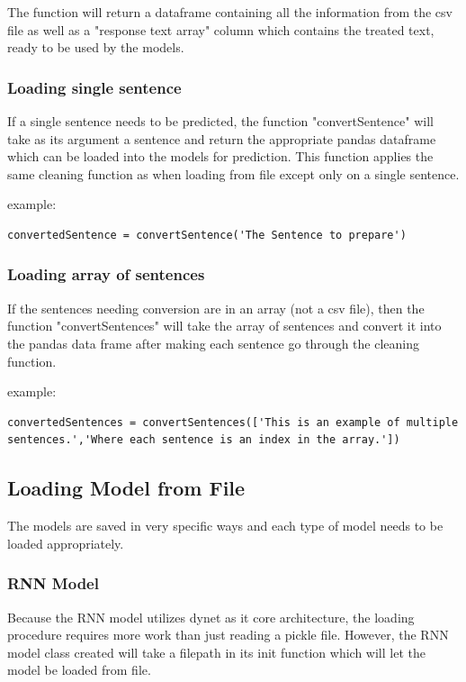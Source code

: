 \documentclass[twoside,twocolumn]{article}
\begin{document}
The function will return a dataframe containing all the information from the csv file as well as a "response text array" column which contains the
treated text, ready to be used by the models.

\subsubsection{Loading single sentence}

If a single sentence needs to be predicted, the function "convertSentence" will take as its argument a sentence and return the appropriate pandas dataframe
which can be loaded into the models for prediction. This function applies the same cleaning function as when loading from file except only on a single sentence.

example:
\begin{lstlisting}
convertedSentence = convertSentence('The Sentence to prepare')
\end{lstlisting}

\subsubsection{Loading array of sentences}

If the sentences needing conversion are in an array (not a csv file), then the function "convertSentences" will take the array of sentences and convert it into
the pandas data frame after making each sentence go through the cleaning function.

example:
\begin{lstlisting}
convertedSentences = convertSentences(['This is an example of multiple sentences.','Where each sentence is an index in the array.'])
\end{lstlisting}
\subsection{Loading Model from File}

The models are saved in very specific ways and each type of model needs to be loaded appropriately.

\subsubsection{RNN Model}

Because the RNN model utilizes dynet as it core architecture, the loading procedure requires more work than just reading a pickle file.
However, the RNN model class created will take a filepath in its init function which will let the model be loaded from file.
\end{document}
